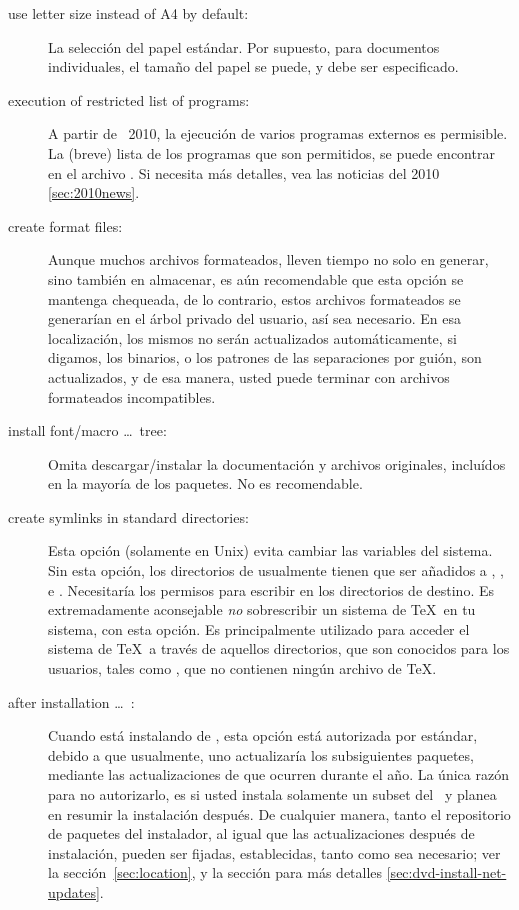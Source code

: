 \documentclass{article}
\begin{document}
\begin{description}
\item[use letter size instead of A4 by default:] La selección del
	papel estándar. Por supuesto, para documentos individuales, el
	tamaño del papel se puede, y debe ser especificado.  

\item[execution of restricted list of programs:] A partir de \TL\
	2010, la ejecución de varios programas externos es permisible.
	La (breve) lista de los programas que son permitidos, se puede
	encontrar en el archivo . Si necesita más
	detalles, vea las noticias del 2010 \ref{sec:2010news}.

\item[create format files:] Aunque muchos archivos formateados, lleven
	tiempo no solo en generar, sino también en almacenar, es aún
	recomendable que esta opción se mantenga chequeada, de lo
	contrario, estos archivos formateados se generarían en el
	árbol privado del usuario, así sea necesario. En esa
	localización, los mismos no serán actualizados
	automáticamente, si digamos, los binarios, o los patrones de
	las separaciones por guión, son actualizados, y de esa manera,
	usted puede terminar con archivos formateados incompatibles. 

\item[install font/macro \ldots\ tree:] Omita descargar/instalar la
	documentación y archivos originales, incluídos en la mayoría de
	los paquetes. No es recomendable. 

\item[create symlinks in standard directories:] Esta opción (solamente
	en Unix) evita cambiar las variables del sistema. Sin esta
	opción, los directorios de \TL{} usualmente tienen que ser
	añadidos a , , e
	. Necesitaría los permisos para escribir en
	los directorios de destino. Es extremadamente aconsejable
	\emph{no} sobrescribir un sistema de \TeX\ en tu sistema, con
	esta opción. Es principalmente utilizado para acceder el
	sistema de \TeX\ a través de aquellos directorios, que son
	conocidos para los usuarios, tales como
	, que no contienen ningún archivo de
	\TeX.

\item[after installation \ldots\ \CTAN:] Cuando está instalando de
	\DVD, esta opción está autorizada por estándar, debido a que
	usualmente, uno actualizaría los subsiguientes paquetes,
	mediante las actualizaciones de \CTAN que ocurren durante el
	año. La única razón para no autorizarlo, es si usted instala
	solamente un subset del \DVD\ y planea en resumir la
	instalación después. De cualquier manera, tanto el repositorio
	de paquetes del instalador, al igual que las actualizaciones
	después de instalación, pueden ser fijadas, establecidas,
	tanto como sea necesario; ver la sección~\ref{sec:location}, y
	la sección para más detalles \ref{sec:dvd-install-net-updates}.
	\end{description}
\end{document}
